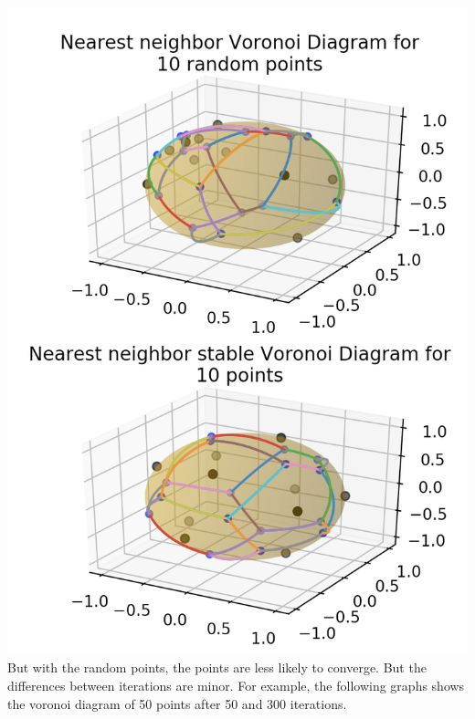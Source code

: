 \documentclass{article}
\begin{document}
\includegraphics[scale=0.4]{v10}
\\
But with the random points, the points are less likely to converge. But the differences between iterations are minor.  For example, the following graphs shows the voronoi diagram of 50 points after 50 and 300 iterations. 
\\
\end{document}
